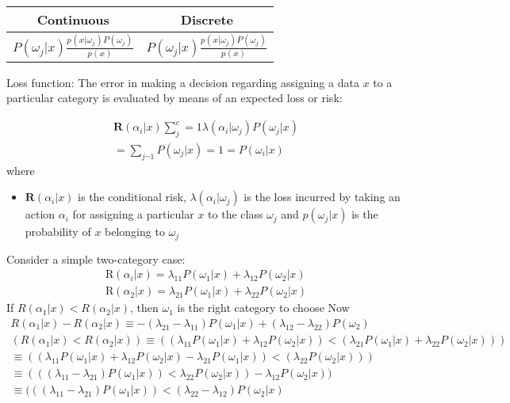 \documentclass[11pt]{article}
\begin{document}
\begin{tabular}{cc}
\hline
Continuous & Discrete\\
\hline
$P(\omega_j | x ) \frac{p(x| \omega_j) P(\omega_j)}{p(x)} $ &
$P(\omega_j | x ) \frac{p(x| \omega_j) P(\omega_j)}{p(x)} $ \\
\hline
\end{tabular}




Loss function:  The error in making a decision regarding assigning a data $x$ to a particular category is evaluated by  means of an expected loss or risk:

\begin{eqnarray*}
\mathbf{R}(\alpha_i | x) \sum ^{c} _j=1 \lambda (\alpha_i | \omega_j) P(\omega_j | x) \\
= \sum _{j \neg 1} P(\omega _j | x) = 1 = P(\omega_i | x) 	
\end{eqnarray*}
where
\begin{itemize}
	\item $\mathbf{R}(\alpha_i | x)$ is the conditional risk, $\lambda ( \alpha_i | \omega_j)$ is the loss incurred by taking an action $\alpha_i$ for assigning a particular  $x$ to the class $\omega_j$ and $p(\omega_j | x)$ is the probability of $x$ belonging to $\omega_j$	
\end{itemize}
	
	
Consider a simple two-category case: 
\begin{eqnarray*}
\mathrm{R}(\alpha_i |x ) = \lambda_{11}P(\omega_1 | x) + \lambda_{12} P(\omega_2 | x) \\
\mathrm{R}(\alpha_2 |x ) = \lambda_{21}P(\omega_1 | x) + \lambda_{22} P(\omega_2 | x) 
\end{eqnarray*}
If $R(\alpha_1 | x) < R(\alpha_2 |x)$, then $\omega_1$ is the right category to choose Now 
\begin{eqnarray}
R(\alpha_1 | x ) - R ( \alpha_2 | x) \equiv -(\lambda _{21} - \lambda_{11}) P(\omega_1 | x) + ( \lambda _{12} - \lambda_{22}) P(\omega_2)  \\
(R(\alpha_1 | x) < R(\alpha_2 |x)) \equiv ((\lambda_{11}P(\omega_1 | x) + \lambda_{12} P(\omega_2 | x)) < (\lambda_{21}P(\omega_1 | x) + \lambda_{22} P(\omega_2 | x) )) \\
\equiv ((\lambda_{11}P(\omega_1 | x) + \lambda_{12} P(\omega_2 | x) - \lambda_{21}P(\omega_1 | x)) < (\lambda_{22} P(\omega_2 | x) ) ) \\
\equiv (((\lambda_{11} - \lambda_{21})P(\omega_1 | x) ) < \lambda_{22} P(\omega_2 | x) )  - \lambda_{12} P(\omega_2 | x)) \\
\equiv (((\lambda_{11} - \lambda_{21})P(\omega_1 | x) ) < (\lambda_{22} - \lambda_{12}) P(\omega_2 | x)  
\end{eqnarray}
	
\end{document}
